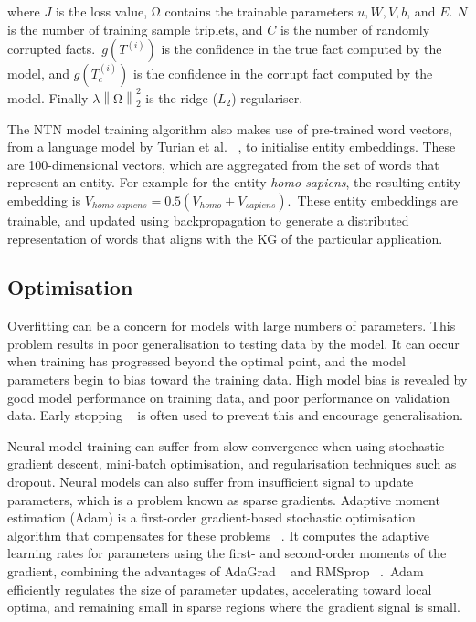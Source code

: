 \noindent where $J$ is the loss value, $\si{\ohm}$ contains the trainable parameters $u, W, V, b $, and $ E $. $N$ is the number of training sample triplets, and $ C $ is the number of randomly corrupted facts.\ $ g(T^{(i)}) $ is the confidence in the true fact computed by the model, and $ g(T_c^{(i)}) $ is the confidence in the corrupt fact computed by the model. Finally $\lambda\left\lVert \si{\ohm} \right\rVert_2^2$ is the ridge ($L_2$) regulariser. \par

\noindent The NTN model training algorithm also makes use of pre-trained word vectors, from a language model by Turian et al. \unskip ~\citep{turian2010word}, to initialise entity embeddings. These are 100-dimensional vectors, which are aggregated from the set of words that represent an entity. For example for the entity \textit{homo sapiens}, the resulting entity embedding is $V_{homo \; sapiens} = 0.5(V_{homo} + V_{sapiens})$.\ These entity embeddings are trainable, and updated using backpropagation to generate a distributed representation of words that aligns with the KG of the particular application. \par

\subsection{Optimisation} 

Overfitting can be a concern for models with large numbers of parameters. This problem results in poor generalisation to testing data by the model. It can occur when training has progressed beyond the optimal point, and the model parameters begin to bias toward the training data. High model bias is revealed by good model performance on training data, and poor performance on validation data. Early stopping \unskip~\citep{prechelt1998early} is often used to prevent this and encourage generalisation. \par

\noindent Neural model training can suffer from slow convergence when using stochastic gradient descent, mini-batch optimisation, and regularisation techniques such as dropout. Neural models can also suffer from insufficient signal to update parameters, which is a problem known as sparse gradients. Adaptive moment estimation (Adam) is a first-order gradient-based stochastic optimisation algorithm that compensates for these problems \unskip ~\citep{kingma2014adam}. It computes the adaptive learning rates for parameters using the first- and second-order moments of the gradient, combining the advantages of AdaGrad \unskip ~\citep{duchi2011adaptive} and RMSprop \unskip ~\citep{tieleman2012lecture}.\ Adam efficiently regulates the size of parameter updates, accelerating toward local optima, and remaining small in sparse regions where the gradient signal is small. \par

